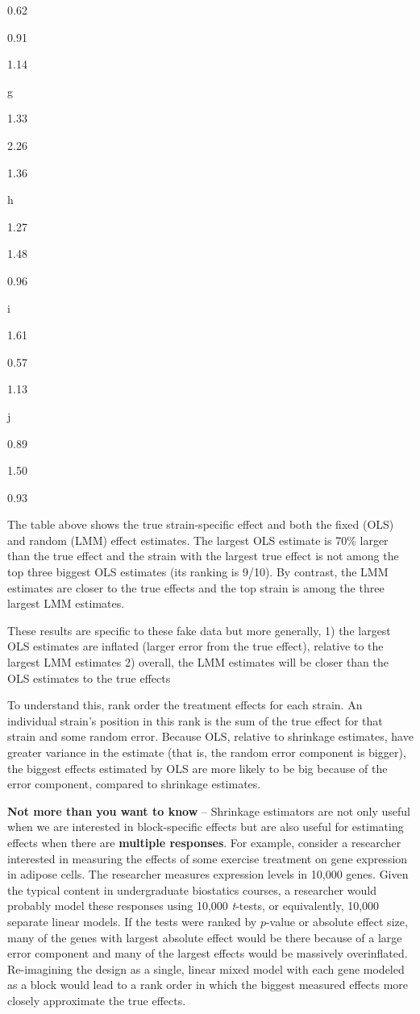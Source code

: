 \documentclass[]{book}
\begin{document}
0.62

0.91

1.14

g

1.33

2.26

1.36

h

1.27

1.48

0.96

i

1.61

0.57

1.13

j

0.89

1.50

0.93

The table above shows the true strain-specific effect and both the fixed (OLS) and random (LMM) effect estimates. The largest OLS estimate is 70\% larger than the true effect and the strain with the largest true effect is not among the top three biggest OLS estimates (its ranking is 9/10). By contrast, the LMM estimates are closer to the true effects and the top strain is among the three largest LMM estimates.

These results are specific to these fake data but more generally,
1) the largest OLS estimates are inflated (larger error from the true effect), relative to the largest LMM estimates
2) overall, the LMM estimates will be closer than the OLS estimates to the true effects

To understand this, rank order the treatment effects for each strain. An individual strain's position in this rank is the sum of the true effect for that strain and some random error. Because OLS, relative to shrinkage estimates, have greater variance in the estimate (that is, the random error component is bigger), the biggest effects estimated by OLS are more likely to be big because of the error component, compared to shrinkage estimates.

\textbf{Not more than you want to know} -- Shrinkage estimators are not only useful when we are interested in block-specific effects but are also useful for estimating effects when there are \textbf{multiple responses}. For example, consider a researcher interested in measuring the effects of some exercise treatment on gene expression in adipose cells. The researcher measures expression levels in 10,000 genes. Given the typical content in undergraduate biostatics courses, a researcher would probably model these responses using 10,000 \emph{t}-tests, or equivalently, 10,000 separate linear models. If the tests were ranked by \(p\)-value or absolute effect size, many of the genes with largest absolute effect would be there because of a large error component and many of the largest effects would be massively overinflated. Re-imagining the design as a single, linear mixed model with each gene modeled as a block would lead to a rank order in which the biggest measured effects more closely approximate the true effects.
\end{document}
